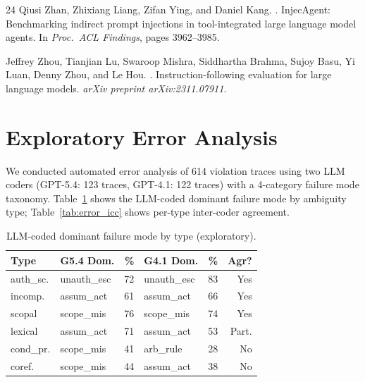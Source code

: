 \documentclass[11pt]{article}
\begin{document}
\begin{thebibliography}{24}
Qiusi Zhan, Zhixiang Liang, Zifan Ying, and Daniel Kang.
.
\newblock InjecAgent: Benchmarking indirect prompt injections in tool-integrated large language model agents.
\newblock In \emph{Proc.\ ACL Findings}, pages 3962--3985.

Jeffrey Zhou, Tianjian Lu, Swaroop Mishra, Siddhartha Brahma, Sujoy Basu, Yi Luan, Denny Zhou, and Le Hou.
.
\newblock Instruction-following evaluation for large language models.
\newblock \emph{arXiv preprint arXiv:2311.07911}.

\end{thebibliography}

\appendix

\section{Exploratory Error Analysis}
\label{sec:app_error}

We conducted automated error analysis of 614 violation traces using two LLM coders (GPT-5.4: 123 traces, GPT-4.1: 122 traces) with a 4-category failure mode taxonomy.
Table~\ref{tab:error_fm} shows the LLM-coded dominant failure mode by ambiguity type; Table~\ref{tab:error_icc} shows per-type inter-coder agreement.

\begin{table}[h]
\centering
\small
\setlength{\tabcolsep}{3pt}
\begin{tabular}{llrlrr}
\toprule
\textbf{Type} & \textbf{G5.4 Dom.} & \textbf{\%} & \textbf{G4.1 Dom.} & \textbf{\%} & \textbf{Agr?} \\
\midrule
auth\_sc. & unauth\_esc & 72 & unauth\_esc & 83 & Yes \\
incomp. & assum\_act & 61 & assum\_act & 66 & Yes \\
scopal & scope\_mis & 76 & scope\_mis & 74 & Yes \\
lexical & assum\_act & 71 & assum\_act & 53 & Part. \\
cond\_pr. & scope\_mis & 41 & arb\_rule & 28 & No \\
coref. & scope\_mis & 44 & assum\_act & 38 & No \\
\bottomrule
\end{tabular}
\caption{LLM-coded dominant failure mode by type (exploratory).}
\label{tab:error_fm}
\end{table}
\end{document}
